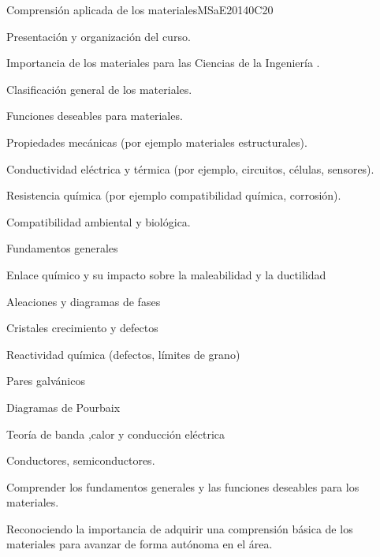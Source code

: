 \begin{syllabus}
\begin{unit}{Comprensión aplicada de los materiales}{}{MSaE2014}{0}{C20}
\begin{topics}
      \item Presentación y organización del curso.
      \item Importancia de los materiales para las Ciencias de la Ingeniería .
      \item Clasificación general de los materiales.
      \item Funciones deseables para materiales.
	  \begin{subtopics}
	      \item Propiedades mecánicas (por ejemplo materiales estructurales).
	      \item Conductividad eléctrica y térmica (por ejemplo, circuitos, células, sensores).
	      \item Resistencia química (por ejemplo compatibilidad química, corrosión).
	      \item Compatibilidad ambiental y biológica.
	  \end{subtopics}
      \item Fundamentos generales
	  \begin{subtopics}
	      \item Enlace químico y su impacto sobre la maleabilidad y la ductilidad
	      \item Aleaciones y diagramas de fases
	      \item Cristales crecimiento y defectos
	      \item Reactividad química (defectos, límites de grano)
	      \item Pares galvánicos
	      \item Diagramas de Pourbaix
	      \item Teoría de banda ,calor y conducción eléctrica
	      \item Conductores, semiconductores.
	  \end{subtopics}      
\end{topics}
   \begin{learningoutcomes}
    \item Comprender los fundamentos generales y las funciones deseables para los materiales.
    \item Reconociendo la importancia de adquirir una comprensión básica de los materiales para avanzar de forma autónoma en el área.
   \end{learningoutcomes}
\end{unit}


\end{syllabus}
